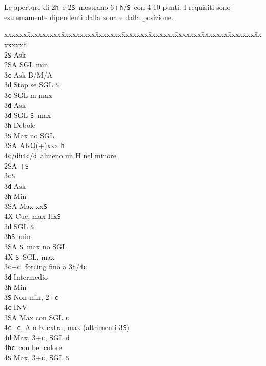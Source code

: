 \documentclass[a4paper,italian]{article}
\newcommand{\BS}{\small{\texttt{S}}}
\newcommand{\BC}{\small{\texttt{c}}}
\newcommand{\BD}{\small{\texttt{d}}}
\newcommand{\BH}{\small{\texttt{h}}}
\newenvironment{bidtable}
{\begin{tabbing}

    xxxxxx\=xxxxxxxxx\=xxxxxxxxx\=xxxxxxx\=xxxxxxx\=xxxxxxx\=xxxxxxx\=xxxxxxx\=xxxxxxx\=xxxxxxx\=\kill}
{\end{tabbing} }%
\begin{document}
\begin{multicols*}{2}
    Le aperture di 2\BH\ e 2\BS\ mostrano 6+\BH/\BS\ con 4-10 punti. I requisiti sono estremamente dipendenti
    dalla zona e dalla posizione.
    \begin{bidtable}
        2\BH\+\\
        2\BS \> Ask\+\\
        2\small{SA} \> SGL min\+\\
        3\BC \> Ask B/M/A\\
        3\BD \> Stop se SGL \BS \-\\
        3\BC \> SGL m max\+\\
        3\BD \> Ask\-\\
        3\BD \> SGL \BS\ max\\
        3\BH \> Debole\\
        3\BS \> Max no SGL\\
        3\small{SA} \> AKQ(+)xxx \BH\\
        4\BC/\BD {}\BH 4\BC /\BD\ almeno un H nel minore\-\\
        2\small{SA} +\BS \+\\
        3\BC {}\BS \+\\
        3\BD \> Ask\+\\
        3\BH \> Min\\
        3\small{SA} \> Max xx\BS \\
        4X \> Cue, max Hx\BS\-\-\\
        3\BD \> SGL \BS \\
        3\BH {}\BS\ min\\
        3\small{SA} \BS\ max no SGL\\
        4X \BS\ SGL, max\-\\
        3\BC {}+\BC, forcing fino a 3\BH/4\BC\+\\
        3\BD \> Intermedio\\
        3\BH\> Min\\
        3\BS\> Non min, 2+\BC\+\\
        4\BC\> INV\-\\
        3\small{SA}\> Max con SGL \BC\\
        4\BC{}+\BC, A o K extra, max (altrimenti 3\BS)\\
        4\BD\> Max, 3+\BC, SGL \BD\\
        4\BH{}\BC\ con bel colore\\
        4\BS\> Max, 3+\BC, SGL \BS\-\\

\end{bidtable}
\end{multicols*}
\end{document}
